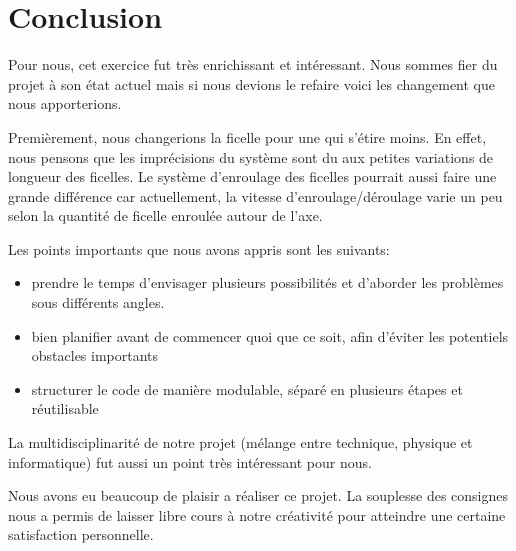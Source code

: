 \chapter{Conclusion}
Pour nous, cet exercice fut très enrichissant et intéressant.
Nous sommes fier du projet à son état actuel mais si nous devions le refaire voici les changement que nous apporterions.

Premièrement, nous changerions la ficelle pour une qui s'étire moins. En effet, nous pensons que les imprécisions du système sont du aux petites variations de longueur des ficelles.
Le système d'enroulage des ficelles pourrait aussi faire une grande différence car actuellement, la vitesse d'enroulage/déroulage varie un peu selon la quantité de ficelle enroulée autour de l'axe.

Les points importants que nous avons appris sont les suivants:
\begin{itemize}
  \item prendre le temps d'envisager plusieurs possibilités et d'aborder les problèmes sous différents angles.
  \item bien planifier avant de commencer quoi que ce soit, afin d'éviter les potentiels obstacles importants
  \item structurer le code de manière modulable, séparé en plusieurs étapes et réutilisable
\end{itemize}

La multidisciplinarité de notre projet (mélange entre technique, physique et informatique) fut aussi un point très intéressant pour nous.

Nous avons eu beaucoup de plaisir a réaliser ce projet.
La souplesse des consignes nous a permis de laisser libre cours à notre créativité pour atteindre une certaine satisfaction personnelle.
